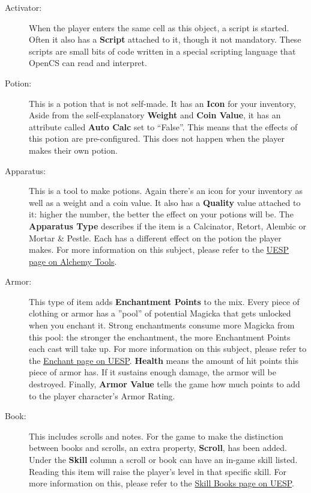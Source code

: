 \begin{description}
 \item[Activator:] When the player enters the same cell as this object, a script is started. Often it also has a \textbf{Script} attached to it, though it not mandatory. These scripts are small bits of code written in a special scripting language that OpenCS can read and interpret.
 \item[Potion:] This is a potion that is not self-made. It has an \textbf{Icon} for your inventory, Aside from the self-explanatory \textbf{Weight} and \textbf{Coin Value}, it has an attribute called \textbf{Auto Calc} set to ``False''. This means that the effects of this potion are pre-configured. This does not happen when the player makes their own potion.
 \item[Apparatus:] This is a tool to make potions. Again there's an icon for your inventory as well as a weight and a coin value. It also has a \textbf{Quality} value attached to it: higher the number, the better the effect on your potions will be. The \textbf{Apparatus Type} describes if the item is a Calcinator, Retort, Alembic or Mortar & Pestle. Each has a different effect on the potion the player makes. For more information on this subject, please refer to the \href{http://www.uesp.net/wiki/Morrowind:Alchemy#Tools}{UESP page on Alchemy Tools}.
 \item[Armor:] This type of item adds \textbf{Enchantment Points} to the mix. Every piece of clothing or armor has a ''pool'' of potential Magicka that gets unlocked when you enchant it. Strong enchantments consume more Magicka from this pool: the stronger the enchantment, the more Enchantment Points each cast will take up. For more information on this subject, please refer to the \href{http://www.uesp.net/wiki/Morrowind:Enchant}{Enchant page on UESP}. \textbf{Health} means the amount of hit points this piece of armor has. If it sustains enough damage, the armor will be destroyed. Finally, \textbf{Armor Value} tells the game how much points to add to the player character's Armor Rating.
 \item[Book:] This includes scrolls and notes. For the game to make the distinction between books and scrolls, an extra property, \textbf{Scroll}, has been added. Under the \textbf{Skill} column a scroll or book can have an in-game skill listed. Reading this item will raise the player's level in that specific skill. For more information on this, please refer to the \href{http://www.uesp.net/wiki/Morrowind:Skill_Books}{Skill Books page on UESP}.

\end{description}
